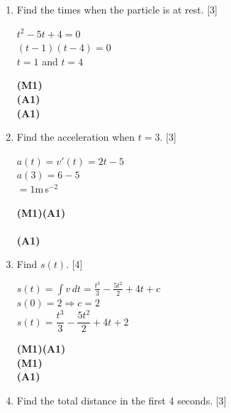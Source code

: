 \documentclass[12pt, twoside]{article}
\begin{document}
\begin{enumerate}[itemsep=0.2cm]
\begin{enumerate}[itemsep=0.3cm]
  \medskip
  \item Find the times when the particle is at rest. \hfill [3]

  \begin{minipage}[t]{0.62\textwidth}
  $t^2 - 5t + 4 = 0$\\[0.15cm]
  $(t - 1)(t - 4) = 0$\\[0.15cm]
  $t = 1$ and $t = 4$
  \end{minipage}%
  \begin{minipage}[t]{0.35\textwidth}\raggedleft
  \textbf{(M1)}\\[0.15cm]
  \textbf{(A1)}\\[0.15cm]
  \textbf{(A1)}
  \end{minipage}

  \medskip
  \item Find the acceleration when $t = 3$. \hfill [3]

  \begin{minipage}[t]{0.62\textwidth}
  $a(t) = v'(t) = 2t - 5$\\[0.15cm]
  $a(3) = 6 - 5$\\[0.15cm]
  $= 1$\;m\,s$^{-2}$
  \end{minipage}%
  \begin{minipage}[t]{0.35\textwidth}\raggedleft
  \textbf{(M1)(A1)}\\[0.15cm]
  ~\\[0.15cm]
  \textbf{(A1)}
  \end{minipage}

  \medskip
  \item Find $s(t)$. \hfill [4]

  \begin{minipage}[t]{0.62\textwidth}
  $s(t) = \displaystyle\int v\,dt = \frac{t^3}{3} - \frac{5t^2}{2} + 4t + c$\\[0.3cm]
  $s(0) = 2 \Rightarrow c = 2$\\[0.15cm]
  $s(t) = \dfrac{t^3}{3} - \dfrac{5t^2}{2} + 4t + 2$
  \end{minipage}%
  \begin{minipage}[t]{0.35\textwidth}\raggedleft
  \textbf{(M1)(A1)}\\[0.3cm]
  \textbf{(M1)}\\[0.15cm]
  \textbf{(A1)}
  \end{minipage}

  \medskip
  \item Find the total distance in the first 4 seconds. \hfill [3]


\end{enumerate}
\end{enumerate}
\end{document}
